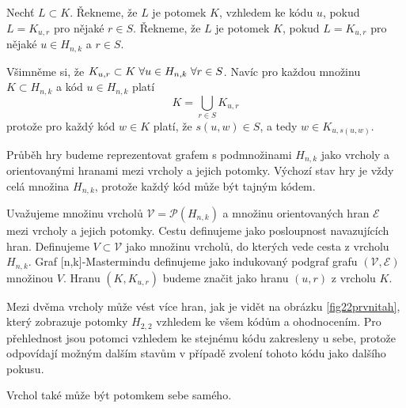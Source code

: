 \begin{pozn}
    Nechť $L \subset K$. Řekneme, že $L$ je potomek $K$, vzhledem ke kódu $u$, pokud $L = K_{u,r}$ pro nějaké $r \in S$. Řekneme, že $L$ je potomek $K$, pokud $L = K_{u,r}$ pro nějaké $u\in H_{n,k}$ a $r \in S$. 
\end{pozn}

\begin{pozn}
    Všimněme si, že $K_{u,r} \subset K \hspace{3px}\forall u\in H_{n,k} \hspace{3px}\forall r\in S$. Navíc pro každou množinu $K \subset H_{n,k}$ a kód $u \in H_{n,k}$ platí
    \[K = \bigcup_{r\in S} K_{u,r}\]
    protože pro každý kód $w \in K$ platí, že $s(u,w) \in S$, a tedy $w \in K_{u, s(u,w)}$. 
\end{pozn}

Průběh hry budeme reprezentovat grafem s podmnožinami $H_{n,k}$ jako vrcholy a orientovanými hranami mezi vrcholy a jejich potomky. Výchozí stav hry je vždy celá množina $H_{n,k}$, protože každý kód může být tajným kódem. 

\begin{definice}
  Uvažujeme množinu vrcholů $\mathcal{V} = \mathcal{P}(H_{n,k})$ a množinu orientovaných hran $\mathcal{E}$ mezi vrcholy a jejich potomky. Cestu definujeme jako posloupnost navazujících hran. Definujeme $V \subset \mathcal{V}$ jako množinu vrcholů, do kterých vede cesta z vrcholu $H_{n,k}$. Graf [n,k]-Mastermindu definujeme jako indukovaný podgraf grafu $(\mathcal{V}, \mathcal{E})$ množinou $V$. Hranu $(K, K_{u,r})$ budeme značit jako hranu $(u,r)$ z vrcholu $K$.
\end{definice}
 
\begin{pozn}
    Mezi dvěma vrcholy může vést více hran, jak je vidět na obrázku \ref{fig22prvnitah}, který zobrazuje potomky $H_{2,2}$ vzhledem ke všem kódům a ohodnocením. Pro přehlednost jsou potomci vzhledem ke stejnému kódu zakresleny u sebe, protože odpovídají možným dalším stavům v případě zvolení tohoto kódu jako dalšího pokusu. 
    
    Vrchol také může být potomkem sebe samého. 
\end{pozn}


